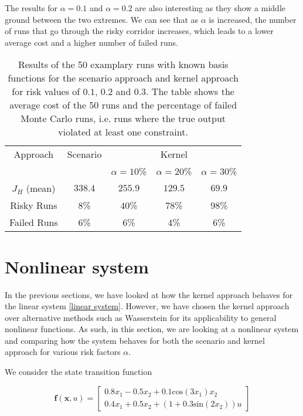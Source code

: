 The results for $\alpha = 0.1$ and $\alpha = 0.2$ are also interesting as they show a middle ground between the two extremes. We can see that as $\alpha$ is increased, the number of runs that go through the risky corridor increases, which leads to a lower average cost and a higher number of failed runs. 


\begin{table}
\centering
\begin{tabular}{|c| c| c| c| c|}
\hline
Approach & Scenario &  \multicolumn{3}{|c|}{Kernel}\\  \cline{3-5} & &  $\alpha = 10$\% & $\alpha = 20$\% & $\alpha = 30$\% \\
\hline
$J_H$ (mean) & $338.4$ & $255.9$ & $129.5$ & $69.9$\\
\hline
Risky Runs & $8$\% & $40$\% & $78$\% & $98$\% \\
\hline
Failed Runs & $6$\% & $6$\% & $4$\% & $6$\% \\
\hline
\end{tabular}
\caption{Results of the 50 examplary runs with known basis functions for the scenario approach and kernel approach for risk values of $0.1$, $0.2$ and $0.3$. The table shows the average cost of the 50 runs and the percentage of failed Monte Carlo runs, i.e. runs where the true output violated at least one constraint.}
\label{tab:results_corridor}
\end{table} 


\section{Nonlinear system} \label{Nonlinear system}

In the previous sections, we have looked at how the kernel approach behaves for the linear system \eqref{linear system}. However, we have chosen the kernel approach over alternative methods such as Wasserstein for its applicability to general nonlinear functions. As such, in this section, we are looking at a nonlinear system and comparing how the system behaves for both the scenario and kernel approach for various risk factors $\alpha$.

We consider the state transition function

\begin{equation} \label{nonlinear system}
\boldsymbol{f}(\boldsymbol{x}, u) = 
\begin{bmatrix}
0.8  x_1 - 0.5 x_2 + 0.1 \text{cos} ( 3 x_1) x_2 \\
0.4 x_1 + 0.5 x_2 + (1 + 0.3 \text{sin} (2 x_2)) u
\end{bmatrix}
\end{equation}

